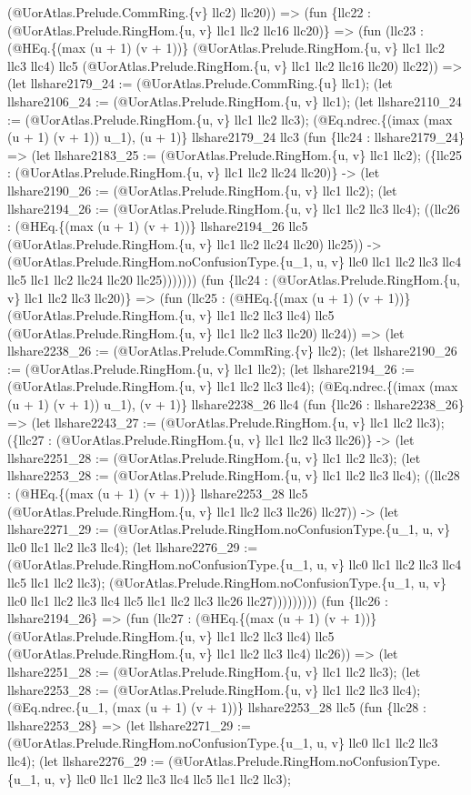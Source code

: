 \documentclass[11pt]{article}
\begin{document}
(@UorAtlas.Prelude.CommRing.\{v\} llc2) llc20)) => (fun \{llc22 : (@UorAtlas.Prelude.RingHom.\{u, v\} llc1 llc2 llc16 llc20)\} => (fun (llc23 : (@HEq.\{(max (u + 1) (v + 1))\} (@UorAtlas.Prelude.RingHom.\{u, v\} llc1 llc2 llc3 llc4) llc5 (@UorAtlas.Prelude.RingHom.\{u, v\} llc1 llc2 llc16 llc20) llc22)) => (let llshare2179\_24 := (@UorAtlas.Prelude.CommRing.\{u\} llc1); (let llshare2106\_24 := (@UorAtlas.Prelude.RingHom.\{u, v\} llc1); (let llshare2110\_24 := (@UorAtlas.Prelude.RingHom.\{u, v\} llc1 llc2 llc3); (@Eq.ndrec.\{(imax (max (u + 1) (v + 1)) u\_1), (u + 1)\} llshare2179\_24 llc3 (fun \{llc24 : llshare2179\_24\} => (let llshare2183\_25 := (@UorAtlas.Prelude.RingHom.\{u, v\} llc1 llc2); (\{llc25 : (@UorAtlas.Prelude.RingHom.\{u, v\} llc1 llc2 llc24 llc20)\} -> (let llshare2190\_26 := (@UorAtlas.Prelude.RingHom.\{u, v\} llc1 llc2); (let llshare2194\_26 := (@UorAtlas.Prelude.RingHom.\{u, v\} llc1 llc2 llc3 llc4); ((llc26 : (@HEq.\{(max (u + 1) (v + 1))\} llshare2194\_26 llc5 (@UorAtlas.Prelude.RingHom.\{u, v\} llc1 llc2 llc24 llc20) llc25)) -> (@UorAtlas.Prelude.RingHom.noConfusionType.\{u\_1, u, v\} llc0 llc1 llc2 llc3 llc4 llc5 llc1 llc2 llc24 llc20 llc25))))))) (fun \{llc24 : (@UorAtlas.Prelude.RingHom.\{u, v\} llc1 llc2 llc3 llc20)\} => (fun (llc25 : (@HEq.\{(max (u + 1) (v + 1))\} (@UorAtlas.Prelude.RingHom.\{u, v\} llc1 llc2 llc3 llc4) llc5 (@UorAtlas.Prelude.RingHom.\{u, v\} llc1 llc2 llc3 llc20) llc24)) => (let llshare2238\_26 := (@UorAtlas.Prelude.CommRing.\{v\} llc2); (let llshare2190\_26 := (@UorAtlas.Prelude.RingHom.\{u, v\} llc1 llc2); (let llshare2194\_26 := (@UorAtlas.Prelude.RingHom.\{u, v\} llc1 llc2 llc3 llc4); (@Eq.ndrec.\{(imax (max (u + 1) (v + 1)) u\_1), (v + 1)\} llshare2238\_26 llc4 (fun \{llc26 : llshare2238\_26\} => (let llshare2243\_27 := (@UorAtlas.Prelude.RingHom.\{u, v\} llc1 llc2 llc3); (\{llc27 : (@UorAtlas.Prelude.RingHom.\{u, v\} llc1 llc2 llc3 llc26)\} -> (let llshare2251\_28 := (@UorAtlas.Prelude.RingHom.\{u, v\} llc1 llc2 llc3); (let llshare2253\_28 := (@UorAtlas.Prelude.RingHom.\{u, v\} llc1 llc2 llc3 llc4); ((llc28 : (@HEq.\{(max (u + 1) (v + 1))\} llshare2253\_28 llc5 (@UorAtlas.Prelude.RingHom.\{u, v\} llc1 llc2 llc3 llc26) llc27)) -> (let llshare2271\_29 := (@UorAtlas.Prelude.RingHom.noConfusionType.\{u\_1, u, v\} llc0 llc1 llc2 llc3 llc4); (let llshare2276\_29 := (@UorAtlas.Prelude.RingHom.noConfusionType.\{u\_1, u, v\} llc0 llc1 llc2 llc3 llc4 llc5 llc1 llc2 llc3); (@UorAtlas.Prelude.RingHom.noConfusionType.\{u\_1, u, v\} llc0 llc1 llc2 llc3 llc4 llc5 llc1 llc2 llc3 llc26 llc27))))))))) (fun \{llc26 : llshare2194\_26\} => (fun (llc27 : (@HEq.\{(max (u + 1) (v + 1))\} (@UorAtlas.Prelude.RingHom.\{u, v\} llc1 llc2 llc3 llc4) llc5 (@UorAtlas.Prelude.RingHom.\{u, v\} llc1 llc2 llc3 llc4) llc26)) => (let llshare2251\_28 := (@UorAtlas.Prelude.RingHom.\{u, v\} llc1 llc2 llc3); (let llshare2253\_28 := (@UorAtlas.Prelude.RingHom.\{u, v\} llc1 llc2 llc3 llc4); (@Eq.ndrec.\{u\_1, (max (u + 1) (v + 1))\} llshare2253\_28 llc5 (fun \{llc28 : llshare2253\_28\} => (let llshare2271\_29 := (@UorAtlas.Prelude.RingHom.noConfusionType.\{u\_1, u, v\} llc0 llc1 llc2 llc3 llc4); (let llshare2276\_29 := (@UorAtlas.Prelude.RingHom.noConfusionType.\{u\_1, u, v\} llc0 llc1 llc2 llc3 llc4 llc5 llc1 llc2 llc3); 
\end{document}
